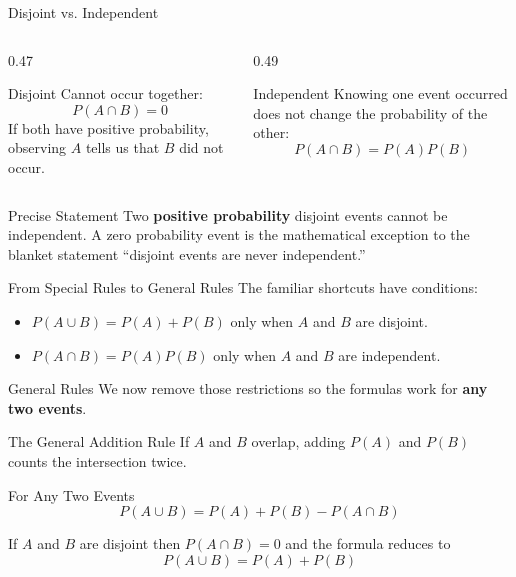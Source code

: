 \documentclass[aspectratio=169]{beamer}
\begin{document}
\begin{frame}{Disjoint vs. Independent}
\begin{columns}[T]
\begin{column}{0.47\textwidth}
\begin{block}{Disjoint}
Cannot occur together:
$$P(A\cap B)=0$$
If both have positive probability, observing $A$ tells us that $B$ did not occur.
\end{block}
\end{column}
\begin{column}{0.49\textwidth}
\begin{block}{Independent}
Knowing one event occurred does not change the probability of the other:
$$P(A\cap B)=P(A)P(B)$$
\end{block}
\end{column}
\end{columns}
\vspace{0.2cm}
\begin{alertblock}{Precise Statement}
Two \textbf{positive probability} disjoint events cannot be independent. A zero probability event is the mathematical exception to the blanket statement ``disjoint events are never independent.''
\end{alertblock}
\end{frame}

\begin{frame}{From Special Rules to General Rules}
The familiar shortcuts have conditions:
\begin{itemize}
	\item $P(A\cup B)=P(A)+P(B)$ only when $A$ and $B$ are disjoint.
	\item $P(A\cap B)=P(A)P(B)$ only when $A$ and $B$ are independent.
\end{itemize}
\vspace{0.2cm}
\begin{block}{General Rules}
We now remove those restrictions so the formulas work for \textbf{any two events}.
\end{block}
\end{frame}

\begin{frame}{The General Addition Rule}
If $A$ and $B$ overlap, adding $P(A)$ and $P(B)$ counts the intersection twice.
\begin{block}{For Any Two Events}
$$P(A\cup B)=P(A)+P(B)-P(A\cap B)$$
\end{block}
\vspace{0.2cm}
If $A$ and $B$ are disjoint then $P(A\cap B)=0$ and the formula reduces to
$$P(A\cup B)=P(A)+P(B)$$
\end{frame}
\end{document}
